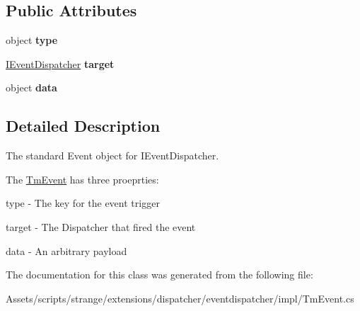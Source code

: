 \subsection*{Public Attributes}
\begin{DoxyCompactItemize}
\item 
\hypertarget{classstrange_1_1extensions_1_1dispatcher_1_1eventdispatcher_1_1impl_1_1_tm_event_a76779732b987bf2d611735a6e6c328f6}{object {\bfseries type}}\label{classstrange_1_1extensions_1_1dispatcher_1_1eventdispatcher_1_1impl_1_1_tm_event_a76779732b987bf2d611735a6e6c328f6}

\item 
\hypertarget{classstrange_1_1extensions_1_1dispatcher_1_1eventdispatcher_1_1impl_1_1_tm_event_a4fad0978eb6dd43804c35390f96c23a6}{\hyperlink{interfacestrange_1_1extensions_1_1dispatcher_1_1eventdispatcher_1_1api_1_1_i_event_dispatcher}{I\-Event\-Dispatcher} {\bfseries target}}\label{classstrange_1_1extensions_1_1dispatcher_1_1eventdispatcher_1_1impl_1_1_tm_event_a4fad0978eb6dd43804c35390f96c23a6}

\item 
\hypertarget{classstrange_1_1extensions_1_1dispatcher_1_1eventdispatcher_1_1impl_1_1_tm_event_a2a7919deb2f3212dd0bcbf2ce86624fb}{object {\bfseries data}}\label{classstrange_1_1extensions_1_1dispatcher_1_1eventdispatcher_1_1impl_1_1_tm_event_a2a7919deb2f3212dd0bcbf2ce86624fb}

\end{DoxyCompactItemize}


\subsection{Detailed Description}
The standard Event object for I\-Event\-Dispatcher. 

The \hyperlink{classstrange_1_1extensions_1_1dispatcher_1_1eventdispatcher_1_1impl_1_1_tm_event}{Tm\-Event} has three proeprties\-: 
\begin{DoxyItemize}
\item type -\/ The key for the event trigger 
\item target -\/ The Dispatcher that fired the event 
\item data -\/ An arbitrary payload 
\end{DoxyItemize}

The documentation for this class was generated from the following file\-:\begin{DoxyCompactItemize}
\item 
Assets/scripts/strange/extensions/dispatcher/eventdispatcher/impl/Tm\-Event.\-cs\end{DoxyCompactItemize}
